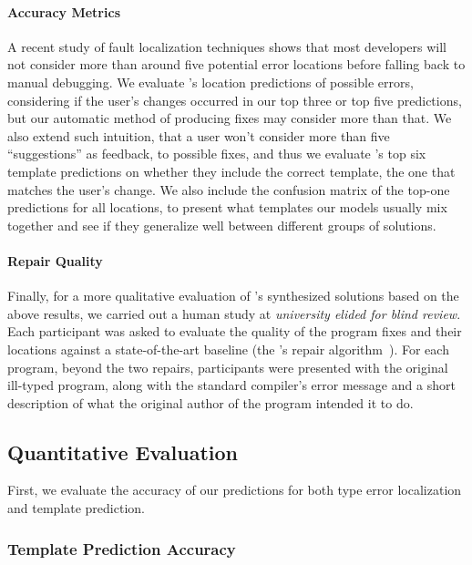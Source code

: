 \paragraph{Accuracy Metrics}
A recent study of fault localization techniques \citep[][]{Kochhar2016-oc} shows
that most developers will not consider more than around five potential error
locations before falling back to manual debugging. We evaluate \toolname's
location predictions of possible errors, considering if the user's changes
occurred in our top three or top five predictions, but our automatic method of
producing fixes may consider more than that. We also extend such intuition, that
a user won't consider more than five ``suggestions'' as feedback, to possible
fixes, and thus we evaluate \toolname's top six template predictions on whether
they include the correct template, \ie the one that matches the user's change. We also
include the confusion matrix of the top-one predictions for all locations,
to present what templates our models usually mix together and see if they
generalize well between different groups of solutions.

\paragraph{Repair Quality}
Finally, for a more qualitative evaluation of \toolname's synthesized solutions
based on the above results, we carried out a human study at \emph{university
elided for blind review}. Each participant was asked to evaluate the quality of
the program fixes and their locations against a state-of-the-art baseline (the
\seminal's repair algorithm~\citep{Lerner2006-pj, Lerner2007-dt}). For each
program, beyond the two repairs, participants were presented with the original
ill-typed program, along with the standard \ocaml compiler's error message and a
short description of what the original author of the program intended it to do.

\subsection{Quantitative Evaluation}
\label{subsec:quan_eval}

First, we evaluate the accuracy of our predictions for both type error
localization and template prediction.


\subsubsection{Template Prediction Accuracy}
\label{subsubsec:templ_acc}

